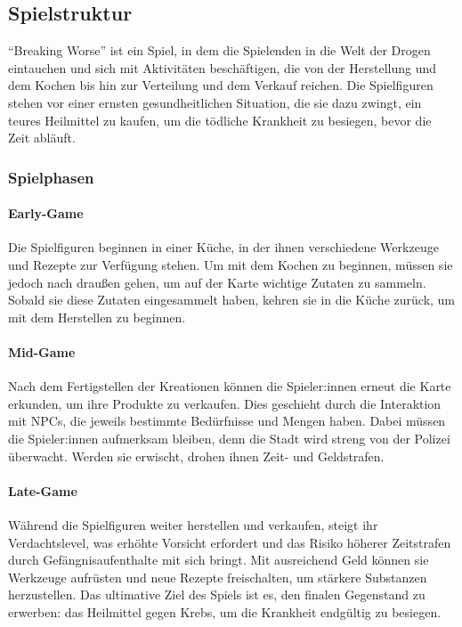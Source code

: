 \subsection{Spielstruktur}\label{subsec:spielstruktur}


"`Breaking Worse"' ist ein Spiel, in dem die Spielenden in die Welt der Drogen eintauchen und sich mit Aktivitäten beschäftigen, die von der Herstellung und dem Kochen bis hin zur Verteilung und dem Verkauf reichen. Die Spielfiguren stehen vor einer ernsten gesundheitlichen Situation, die sie dazu zwingt, ein teures Heilmittel zu kaufen, um die tödliche Krankheit zu besiegen, bevor die Zeit abläuft.

\subsubsection{Spielphasen}

\paragraph{Early-Game} Die Spielfiguren beginnen in einer Küche,
 in der ihnen verschiedene Werkzeuge und Rezepte zur Verfügung stehen.
 Um mit dem Kochen zu beginnen, müssen sie jedoch nach draußen gehen,
 um auf der Karte wichtige Zutaten zu sammeln. Sobald sie diese Zutaten eingesammelt haben, 
 kehren sie in die Küche zurück, um mit dem Herstellen zu beginnen.

\paragraph{Mid-Game} Nach dem Fertigstellen der Kreationen können die Spieler:innen erneut die Karte erkunden, 
um ihre Produkte zu verkaufen. Dies geschieht durch die Interaktion mit NPCs, 
die jeweils bestimmte Bedürfnisse und Mengen haben. 
Dabei müssen die Spieler:innen aufmerksam bleiben, denn die Stadt wird streng von der Polizei überwacht. 
Werden sie erwischt, drohen ihnen Zeit- und Geldstrafen.

\paragraph{Late-Game} Während die Spielfiguren weiter herstellen und verkaufen,
steigt ihr Verdachtslevel, was erhöhte Vorsicht erfordert und das Risiko höherer Zeitstrafen
durch Gefängnisaufenthalte mit sich bringt. Mit ausreichend Geld können sie Werkzeuge aufrüsten
und neue Rezepte freischalten, um stärkere Substanzen herzustellen. Das ultimative Ziel des Spiels ist es,
den finalen Gegenstand zu erwerben: das Heilmittel gegen Krebs,
um die Krankheit endgültig zu besiegen.

